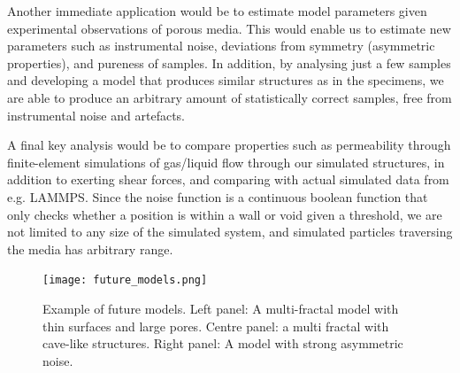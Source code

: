 \documentclass[aps,pre,twocolumn,letterpaper,floatfix,showpacs]{revtex4}
\begin{document}
Another immediate application would be to estimate model parameters given experimental observations of porous media. 
This would enable us to estimate new parameters such as instrumental noise, deviations from symmetry
(asymmetric properties), and pureness of samples. 
In addition, by analysing just a few samples and developing a model that produces similar structures
as in the specimens, we are able to produce an arbitrary amount of statistically correct samples,
free from instrumental noise and artefacts. 

A final key analysis would be to compare properties such as permeability through finite-element
simulations of gas/liquid flow through our simulated structures, in addition to exerting shear forces,
and comparing with actual simulated data from e.g. LAMMPS. 
Since the noise function is a continuous boolean function that only checks whether a position is
within a wall or void given a threshold, we are not limited to any size of the simulated system, and simulated particles traversing the media has arbitrary range.  



\begin{figure}
\texttt{[image: future\_models.png]}
\caption{Example of future models. Left panel: A multi-fractal model with thin surfaces and large pores. Centre panel: a multi fractal with cave-like structures. Right panel: A model with strong asymmetric noise. }
\label{fig:future_models}
\end{figure}


\end{document}
